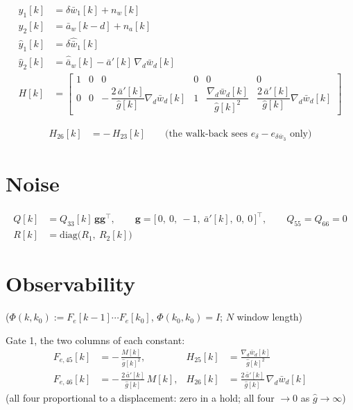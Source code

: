 \documentclass[11pt,a4paper,fontset=none]{ctexart}
\newcommand{\ba}{\bar{a}}
\newcommand{\bw}{\bar{w}}
\newcommand{\ap}{\ba'}
\newcommand{\ah}{\hat{\ba}_w}
\newcommand{\dl}{\delta}
\newcommand{\gh}{\hat{g}}
\begin{document}
\begin{align*}
y_1[k]      &= \delta\bw_1[k] + n_w[k] \\
y_2[k]      &= \ba_w[k-d] + n_a[k] \\
\hat y_1[k] &= \delta\hat{\bw}_1[k] \\
\hat y_2[k] &= \ah[k] - \ap[k]\,\nabla_d\bw_d[k] \\[4pt]
H[k]        &= \begin{bmatrix} 1 & 0 & 0 & 0 & 0 & 0 \\[2pt]
               0 & 0 & -\,\dfrac{2\,\ap[k]}{\gh[k]}\nabla_d\bw_d[k] & 1 & \dfrac{\nabla_d\bw_d[k]}{\gh[k]^{2}} & \dfrac{2\,\ap[k]}{\gh[k]}\nabla_d\bw_d[k] \end{bmatrix}
\end{align*}

\begin{align*}
H_{26}[k] &= -\,H_{23}[k] \qquad\text{(the walk-back sees } e_{\dl} - e_{\delta\bw_3}\text{ only)}
\end{align*}

\section{Noise}

\begin{align*}
Q[k]      &= Q_{33}[k]\,\mathbf{g}\mathbf{g}^{\top}, \qquad \mathbf{g} = \bigl[\,0,\ 0,\ -1,\ \ap[k],\ 0,\ 0\,\bigr]^{\top}, \qquad Q_{55} = Q_{66} = 0 \\
R[k]      &= \mathrm{diag}\bigl(R_1,\ R_2[k]\bigr)
\end{align*}

\section{Observability}

($\Phi(k,k_0) := F_e[k-1]\cdots F_e[k_0]$, $\Phi(k_0,k_0) = I$; $N$ window length)

Gate 1, the two columns of each constant:
\begin{align*}
F_{e,45}[k] &= -\,\frac{M[k]}{\gh[k]^{2}},               & H_{25}[k] &= \frac{\nabla_d\bw_d[k]}{\gh[k]^{2}} \\
F_{e,46}[k] &= -\,\frac{2\,\ap[k]}{\gh[k]}\,M[k],        & H_{26}[k] &= \frac{2\,\ap[k]}{\gh[k]}\,\nabla_d\bw_d[k]
\end{align*}
(all four proportional to a displacement: zero in a hold; all four $\to 0$ as $\gh \to \infty$)
\end{document}
